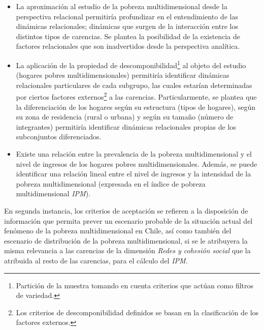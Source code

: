 \documentclass[12pt,letterpaper,spanish]{article}
\begin{document}
\begin{itemize}
    \item La aproximación al estudio de la pobreza multidimensional desde la perspectiva relacional permitiría profundizar en el entendimiento de las dinámicas relacionales; dinámicas que surgen de la interacción entre los distintos tipos de carencias. Se plantea la posibilidad de la existencia de factores relacionales que son inadvertidos desde la perspectiva analítica. 
    
    \item La aplicación de la propiedad de descomponibilidad\footnote{Partición de la muestra tomando en cuenta criterios que actúan como filtros de variedad.} al objeto del estudio (hogares pobres multidimensionales) permitiría identificar dinámicas relacionales particulares de cada subgrupo, las cuales estarían determinadas por ciertos factores externos\footnote{Los criterios de descomponibilidad definidos se basan en la clasificación de los factores externos.} a las carencias. Particularmente, se plantea que la diferenciación de los hogares según su estructura (tipos de hogares), según su zona de residencia (rural o urbana) y según su tamaño (número de integrantes) permitiría identificar dinámicas relacionales propias de los subconjuntos diferenciados. 

    \item Existe una relación entre la prevalencia de la pobreza multidimensional y el nivel de ingresos de los hogares pobres multidimensionales. Además, se puede identificar una relación lineal entre el nivel de ingresos y  la intensidad de la pobreza multidimensional (expresada en el índice de pobreza multidimensional \textit{IPM}). 


\end{itemize}  

En segunda instancia, los criterios de aceptación se refieren a la disposición de información que permita prever un escenario probable de la situación actual del fenómeno de la pobreza multidimensional en Chile, así como también del escenario de distribución de la pobreza multidimensional, si se le atribuyera la misma relevancia a las carencias de la dimensión \textit{Redes y cohesión social} que la atribuida al resto de las carencias, para el cálculo del \textit{IPM}.



 
\end{document}
